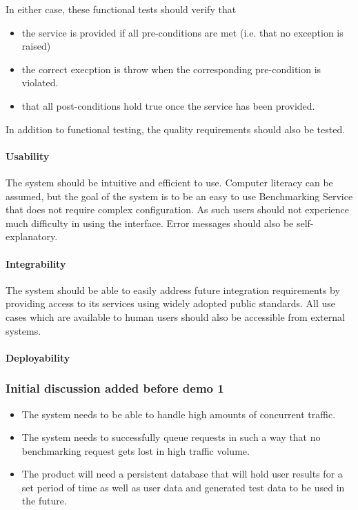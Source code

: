 In either case, these functional tests should verify that
\begin{itemize}
	\item the service is provided if all pre-conditions are met (i.e. that no exception is raised)
	\item the correct execption is throw when the corresponding pre-condition
	is violated.
	\item that all post-conditions hold true once the service has been provided.
\end{itemize}

In addition to functional testing, the quality requirements should also be tested.

\paragraph{Usability}
The system should be intuitive and efficient to use. Computer literacy can be
assumed, but the goal of the system is to be an easy to use Benchmarking
Service that does not require complex configuration. As such users should
not experience much difficulty in using the interface. Error messages should
also be self-explanatory.

\paragraph{Integrability}
The system should be able to easily address future integration requirements
by providing access to its services using widely adopted public standards.
All use cases which are available to human users should also be accessible from external systems.

\paragraph{Deployability}
\label{sec:systemDeployability}


\subsubsection{Initial discussion added before demo 1}
\begin{itemize}
 \item The system needs to be able to handle high amounts of concurrent traffic.
 \item The system needs to successfully queue requests in such a way that no
	   benchmarking request gets lost in high traffic volume.
 \item The product will need a persistent database that will hold user results
       for a set period of time as well as user data and generated test data to
       be used in the future. 
\end{itemize}


